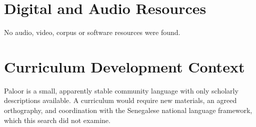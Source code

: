 \documentclass[12pt]{article}
\begin{document}
\section{Digital and Audio Resources}
No audio, video, corpus or software resources were found.

\section{Curriculum Development Context}
Paloor is a small, apparently stable community language with only scholarly descriptions available. A curriculum would require new materials, an agreed orthography, and coordination with the Senegalese national language framework, which this search did not examine.
\end{document}
